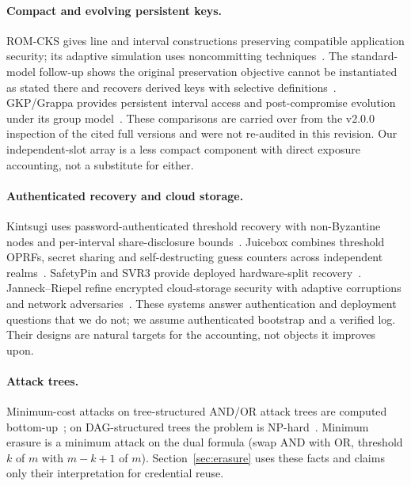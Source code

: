 \documentclass[pdflatex,sn-mathphys-num]{sn-jnl}
\theoremstyle{plain}
\theoremstyle{definition}
\begin{document}
\paragraph{Compact and evolving persistent keys.}
ROM-CKS gives line and interval constructions preserving compatible application security; its adaptive simulation uses noncommitting techniques~\cite{dodis2024}. The standard-model follow-up shows the original preservation objective cannot be instantiated as stated there and recovers derived keys with selective definitions~\cite{dodisstandard2024}. GKP/Grappa provides persistent interval access and post-compromise evolution under its group model~\cite{backendal2026}. These comparisons are carried over from the v2.0.0 inspection of the cited full versions and were not re-audited in this revision. Our independent-slot array is a less compact component with direct exposure accounting, not a substitute for either.

\paragraph{Authenticated recovery and cloud storage.}
Kintsugi uses password-authenticated threshold recovery with non-Byzantine nodes and per-interval share-disclosure bounds~\cite{ma2025}. Juicebox combines threshold OPRFs, secret sharing and self-destructing guess counters across independent realms~\cite{trapp2025}. SafetyPin and SVR3 provide deployed hardware-split recovery~\cite{dauterman2020,connell2024}. Janneck--Riepel refine encrypted cloud-storage security with adaptive corruptions and network adversaries~\cite{janneck2026}. These systems answer authentication and deployment questions that we do not; we assume authenticated bootstrap and a verified log. Their designs are natural targets for the accounting, not objects it improves upon.

\paragraph{Attack trees.}
Minimum-cost attacks on tree-structured AND/OR attack trees are computed bottom-up~\cite{mauw2005}; on DAG-structured trees the problem is NP-hard~\cite{lopuhaa2022}. Minimum erasure is a minimum attack on the dual formula (swap AND with OR, threshold $k$ of $m$ with $m-k+1$ of $m$). Section~\ref{sec:erasure} uses these facts and claims only their interpretation for credential reuse.
\end{document}
